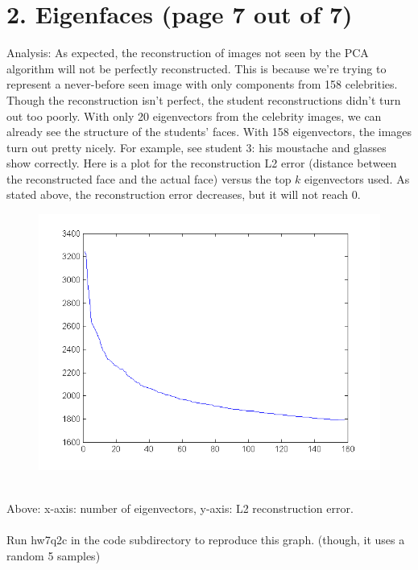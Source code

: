 \documentclass[11pt]{article}
\begin{document}
\section*{2. Eigenfaces (page 7 out of 7)}
Analysis: As expected, the reconstruction of images not seen by the PCA algorithm will not be perfectly reconstructed. This is because we're trying to represent a never-before seen image with only components from 158 celebrities. Though the reconstruction isn't perfect, the student reconstructions didn't turn out too poorly. With only 20 eigenvectors from the celebrity images, we can already see the structure of the students' faces. With 158 eigenvectors, the images turn out pretty nicely. For example, see student 3: his moustache and glasses show correctly. Here is a plot for the reconstruction L2 error (distance between the reconstructed face and the actual face) versus the top $k$ eigenvectors used. As stated above, the reconstruction error decreases, but it will not reach 0. \\
\begin{figure}[ht!]
\centering
\includegraphics[width=180mm]{images/hw7q2cerror.png}
\label{overflow}
\end{figure} \\
Above: x-axis: number of eigenvectors, y-axis: L2 reconstruction error. \\\\
Run hw7q2c in the code subdirectory to reproduce this graph. (though, it uses a random 5 samples)
\newpage
\end{document}
